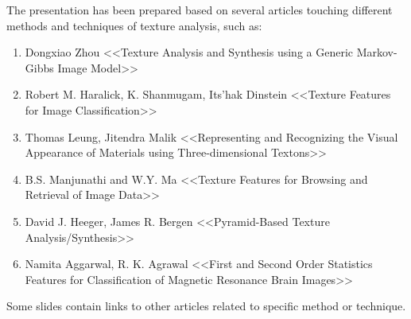 \documentclass[11pt]{article}
\begin{document}
	The presentation has been prepared based on several articles touching different methods and techniques of texture analysis, such as:
	\begin{enumerate}
		\item Dongxiao Zhou <<Texture Analysis and Synthesis using a Generic Markov-Gibbs Image Model>>
		\item Robert M. Haralick, K. Shanmugam, Its'hak Dinstein <<Texture Features for Image \linebreak Classification>>
		\item Thomas Leung, Jitendra Malik <<Representing and Recognizing the Visual Appearance of Materials using Three-dimensional Textons>>
		\item B.S. Manjunathi and W.Y. Ma <<Texture Features for Browsing and Retrieval of Image Data>>
		\item David J. Heeger, James R. Bergen <<Pyramid-Based Texture Analysis/Synthesis>>
		\item Namita Aggarwal, R. K. Agrawal <<First and Second Order Statistics Features \linebreak for Classification of Magnetic Resonance Brain Images>>
	\end{enumerate}
	
	
	Some slides contain links to other articles related to specific method or technique.
\end{document}
